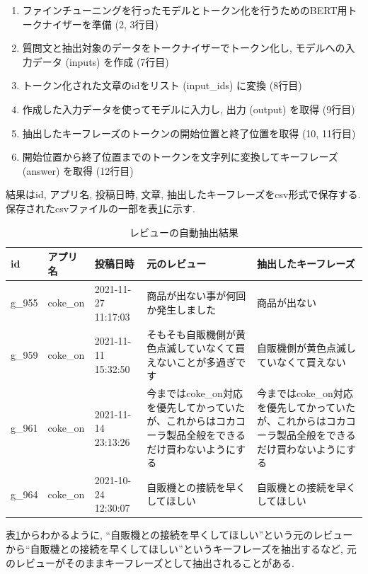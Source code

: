 \begin{enumerate}
  \item ファインチューニングを行ったモデルとトークン化を行うためのBERT用トークナイザーを準備 (2, 3行目)
  \item 質問文と抽出対象のデータをトークナイザーでトークン化し, モデルへの入力データ (inputs) を作成 (7行目)
  \item トークン化された文章のidをリスト (input\_ids) に変換 (8行目)
  \item 作成した入力データを使ってモデルに入力し, 出力 (output) を取得 (9行目)
  \item 抽出したキーフレーズのトークンの開始位置と終了位置を取得 (10, 11行目)
  \item 開始位置から終了位置までのトークンを文字列に変換してキーフレーズ (answer) を取得 (12行目)
\end{enumerate}
結果はid, アプリ名, 投稿日時, 文章, 抽出したキーフレーズをcsv形式で保存する. 保存されたcsvファイルの一部を表\ref{tb:googleqa}に示す. 

\begin{table}[H]
  \caption{レビューの自動抽出結果}
  \label{tb:googleqa}
  \small
  \begin{center}
  \begin{tabularx}{\linewidth}{l|l|X|X|X}
    \hline
    id&アプリ名&投稿日時&元のレビュー&抽出したキーフレーズ\\\hline\hline
    g\_955&coke\_on&2021-11-27 11:17:03&商品が出ない事が何回か発生しました&商品が出ない\\\hline
    g\_959&coke\_on&2021-11-11 15:32:50&そもそも自販機側が黄色点滅していなくて買えないことが多過ぎです&自販機側が黄色点滅していなくて買えない\\\hline
    g\_961&coke\_on&2021-11-14 23:13:26&今まではcoke\_on対応を優先してかっていたが、これからはコカコーラ製品全般をできるだけ買わないようにする&今まではcoke\_on対応を優先してかっていたが、これからはコカコーラ製品全般をできるだけ買わないようにする\\\hline
    g\_964&coke\_on&2021-10-24 12:30:07&自販機との接続を早くしてほしい&自販機との接続を早くしてほしい\\\hline
  \end{tabularx}\end{center}
\end{table}

表\ref{tb:googleqa}からわかるように, ``自販機との接続を早くしてほしい''という元のレビューから``自販機との接続を早くしてほしい''というキーフレーズを抽出するなど, 元のレビューがそのままキーフレーズとして抽出されることがある. 

